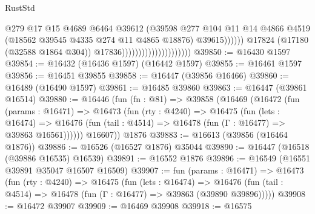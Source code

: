 \begin{lexlean}{RustStd}
\begin{coremodule}
                                                        @279
                                                        @17
                                                        @15
                                                        @4689
                                                        @6464
                                                        @39612
                                                        (@39598
                                                          @277
                                                          @104
                                                          @11
                                                          @14
                                                          @4866
                                                          @4519
                                                          (@18562
                                                            @39545
                                                            @4335
                                                            @274
                                                            @11
                                                            @4865
                                                            @18876)
                                                          @39615))))))
                                              @17824
                                              (@17180 (@32588 @1864 @304))
                                              @17836)))))))))))))))))))))
@39850 := @16430 @1597
@39854 := @16432 (@16436 @1597) (@16442 @1597)
@39855 := @16461 @1597
@39856 := @16451 @39855
@39858 := @16447 (@39856 @16466)
@39860 := @16489 (@16490 @1597)
@39861 := @16485 @39860
@39863 := @16447 (@39861 @16514)
@39880 := @16446
    (fun (fn : @81) =>
    @39858
      (@16469
        (@16472
          (fun (params : @16471) =>
          @16473
            (fun (rty : @4240) =>
            @16475
              (fun (lets : @16474) =>
              @16476 (fun (tail : @4514) => @16478 (fun (Γ : @16477) => @39863 @16561))))))
        @16607))
    @1876
@39883 := @16613 (@39856 (@16464 @1876))
@39886 := @16526 (@16527 @1876) @35044
@39890 := @16447 (@16518 (@39886 @16535) @16539)
@39891 := @16552 @1876
@39896 := @16549 (@16551 @39891 @35047 @16507 @16509)
@39907 := fun (params : @16471) =>
  @16473
    (fun (rty : @4240) =>
    @16475
      (fun (lets : @16474) =>
      @16476 (fun (tail : @4514) => @16478 (fun (Γ : @16477) => @39863 (@39890 @39896)))))
@39908 := @16472 @39907
@39909 := @16469 @39908
@39918 := @16575

\end{coremodule}
\end{lexlean}
